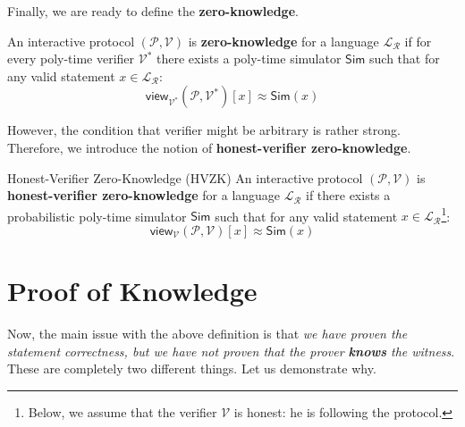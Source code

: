 \documentclass[../lecture-notes.tex]{subfiles}
\begin{document}
Finally, we are ready to define the \textbf{zero-knowledge}.

\begin{definition}
    An interactive protocol $(\mathcal{P}, \mathcal{V})$ is \textbf{zero-knowledge} for a language $\mathcal{L}_{\mathcal{R}}$ if for every poly-time verifier $\mathcal{V}^*$ there exists a poly-time simulator $\mathsf{Sim}$ such that for any valid statement $x \in \mathcal{L}_{\mathcal{R}}$:
    \begin{equation*}
        \mathsf{view}_{\mathcal{V}^*}(\mathcal{P}, \mathcal{V}^*)[x] \approx \mathsf{Sim}(x)
    \end{equation*}
\end{definition}

However, the condition that verifier might be arbitrary is rather strong. Therefore, we introduce the notion of \textbf{honest-verifier zero-knowledge}.

\begin{definition}{Honest-Verifier Zero-Knowledge (HVZK)}
    An interactive protocol $(\mathcal{P}, \mathcal{V})$ is \textbf{honest-verifier zero-knowledge} for a language $\mathcal{L}_{\mathcal{R}}$ if there exists a probabilistic poly-time simulator $\mathsf{Sim}$ such that for any valid statement $x \in \mathcal{L}_{\mathcal{R}}$\footnote{Below, we assume that the verifier $\mathcal{V}$ is honest: he is following the protocol.}:
    \begin{equation*}
        \mathsf{view}_{\mathcal{V}}(\mathcal{P}, \mathcal{V})[x] \approx \mathsf{Sim}(x)
    \end{equation*}
\end{definition}

\section{Proof of Knowledge}

Now, the main issue with the above definition is that \textit{we have proven the statement correctness, but we have not proven that the prover \textbf{knows} the witness}. These are completely two different things. Let us demonstrate why.
\end{document}
